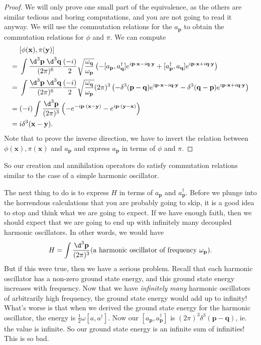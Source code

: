 \documentclass[a4paper]{article}
\begin{document}
\begin{proof}
  We will only prove one small part of the equivalence, as the others are similar tedious and boring computations, and you are not going to read it anyway. We will use the commutation relations for the $a_\mathbf{p}$ to obtain the commutation relations for $\phi$ and $\pi$. We can compute
  \begin{align*}
    &[\phi(\mathbf{x}), \pi(\mathbf{y})]\\
    ={}& \int \frac{\d^3 \mathbf{p}\; \d^3 \mathbf{q}}{(2\pi)^6} \frac{(-i)}{2}\sqrt{\frac{\omega_\mathbf{q}}{\omega_\mathbf{p}}}\left(-[a_\mathbf{p}, a_\mathbf{q}^\dagger] e^{i\mathbf{p} \cdot \mathbf{x} - i \mathbf{q}\cdot \mathbf{y}} + [a_\mathbf{p}^\dagger, a_\mathbf{q}] e^{i\mathbf{p}\cdot \mathbf{x} + i \mathbf{q}\cdot \mathbf{y}}\right)\\
    ={}& \int \frac{\d^3 \mathbf{p}\; \d^3 \mathbf{q}}{(2\pi)^6} \frac{(-i)}{2}\sqrt{\frac{\omega_\mathbf{q}}{\omega_\mathbf{p}}}(2\pi)^3\left(-\delta^3(\mathbf{p} - \mathbf{q}) e^{i\mathbf{p} \cdot \mathbf{x} - i \mathbf{q}\cdot \mathbf{y}} - \delta^3(\mathbf{q} - \mathbf{p}) e^{i\mathbf{p}\cdot \mathbf{x} + i \mathbf{q}\cdot \mathbf{y}}\right)\\
    ={}& (-i) \int \frac{\d^3 \mathbf{p}}{(2\pi)^3} \left(-e^{-i\mathbf{p}\cdot (\mathbf{x} - \mathbf{y})} - e^{i\mathbf{p} \cdot(\mathbf{y} - \mathbf{x})}\right)\\
    ={}& i \delta^3(\mathbf{x} - \mathbf{y}).
  \end{align*}
  Note that to prove the inverse direction, we have to invert the relation between $\phi(\mathbf{x}), \pi(\mathbf{x})$ and $a_\mathbf{p}$ and express $a_\mathbf{p}$ in terms of $\phi$ and $\pi$.
\end{proof}
So our creation and annihilation operators do satisfy commutation relations similar to the case of a simple harmonic oscillator.

The next thing to do is to express $H$ in terms of $a_\mathbf{p}$ and $a_\mathbf{p}^\dagger$. Before we plunge into the horrendous calculations that you are probably going to skip, it is a good idea to stop and think what we are going to expect. If we have enough faith, then we should expect that we are going to end up with infinitely many decoupled harmonic oscillators. In other words, we would have
\[
  H = \int \frac{\d^3 \mathbf{p}}{(2\pi)^3} (\text{a harmonic oscillator of frequency $\omega_\mathbf{p}$}).
\]
But if this were true, then we have a serious problem. Recall that each harmonic oscillator has a non-zero ground state energy, and this ground state energy increases with frequency. Now that we have \emph{infinitely many} harmonic oscillators of arbitrarily high frequency, the ground state energy would add up to infinity! What's worse is that when we derived the ground state energy for the harmonic oscillator, the energy is $\frac{1}{2}\omega [a, a^\dagger]$. Now our $[a_\mathbf{p}, a_\mathbf{p}^\dagger]$ is $(2\pi)^3 \delta^3(\mathbf{p} - \mathbf{q})$, ie. the value is infinite. So our ground state energy is an infinite sum of infinities! This is so bad.
\end{document}
